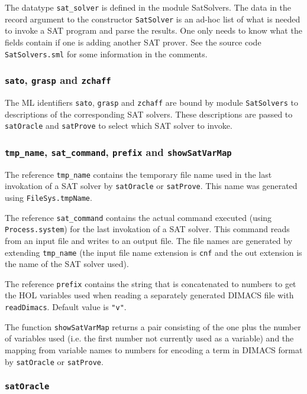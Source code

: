 \documentclass[12pt]{article}
\renewcommand{\t}[1]{\mbox{\small\tt #1}}
\newcommand\HOL{HOL\xspace}
\begin{document}
The datatype \t{sat\_solver} is defined in the module {SatSolvers}.
The data in the record argument to the constructor \t{SatSolver}
is an ad-hoc list of what is needed to invoke a SAT program
and parse the results. One only needs to know what the fields
contain if one is adding another SAT prover. See the
source code {\tt SatSolvers.sml} for some information
in the comments.

\subsubsection{{\tt sato}, {\tt grasp} and {\tt zchaff}}

The ML identifiers \t{sato}, \t{grasp} and \t{zchaff} are bound
by module {\tt SatSolvers} to descriptions of the corresponding SAT solvers.
These descriptions are passed to \t{satOracle} and \t{satProve} to
select which SAT solver to invoke.

\subsubsection{{\tt tmp\_name}, {\tt sat\_command}, {\tt prefix} and {\tt showSatVarMap}}

The reference \t{tmp\_name} contains the temporary file name used in
the last invokation of a SAT solver  by \t{satOracle} or \t{satProve}. This name
was generated using \t{FileSys.tmpName}.



The reference \t{sat\_command} contains the actual command executed
(using \t{Process.system}) for
the last invokation of a SAT solver. This command reads from
an input file and writes to an output file. The file names are generated by extending \t{tmp\_name}
(the input file name extension is \t{cnf} and the out extension is the name of the SAT solver used).


The reference \t{prefix} contains the string that is concatenated to numbers
to get the \HOL variables used when reading a separately generated DIMACS file
with \t{readDimacs}. Default value is {\verb+"v"+}.

The function {\small\verb+showSatVarMap+} returns a pair consisting of
the one plus the number of variables used (i.e. the first number not
currently used as a variable) and the mapping from variable names to
numbers for encoding a term in DIMACS format by
\t{satOracle} or \t{satProve}.


\subsubsection{\tt satOracle}
\end{document}
